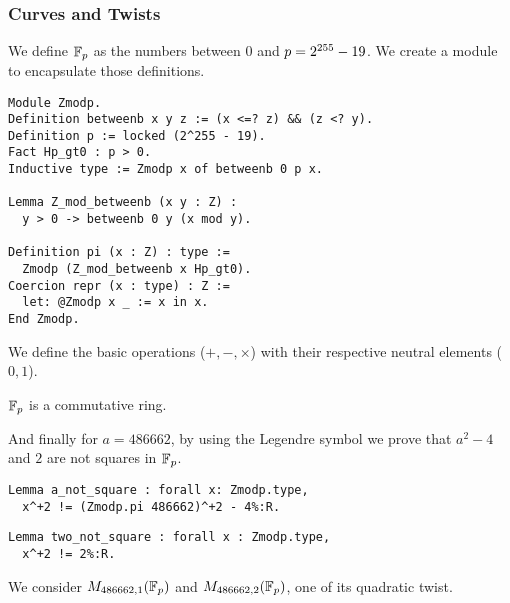 


\subsubsection{Curves and Twists}

We define $\mathbb{F}_{p}$ as the numbers between $0$ and $p = 2^{255}-19$.
We create a  module to encapsulate those definitions.
\begin{lstlisting}[language=Coq]
Module Zmodp.
Definition betweenb x y z := (x <=? z) && (z <? y).
Definition p := locked (2^255 - 19).
Fact Hp_gt0 : p > 0.
Inductive type := Zmodp x of betweenb 0 p x.

Lemma Z_mod_betweenb (x y : Z) :
  y > 0 -> betweenb 0 y (x mod y).

Definition pi (x : Z) : type :=
  Zmodp (Z_mod_betweenb x Hp_gt0).
Coercion repr (x : type) : Z :=
  let: @Zmodp x _ := x in x.
End Zmodp.
\end{lstlisting}

We define the basic operations ($+, -, \times$) with their respective neutral elements ($0, 1$).
\begin{lemma}
$\mathbb{F}_{p}$ is a commutative ring.
\end{lemma}
%
And finally for $a = 486662$, by using the Legendre symbol we prove that $a^2 - 4$ and $2$ are not squares in $\mathbb{F}_{p}$.
\begin{lstlisting}[language=Coq]
Lemma a_not_square : forall x: Zmodp.type,
  x^+2 != (Zmodp.pi 486662)^+2 - 4%:R.
\end{lstlisting}
\begin{lstlisting}[language=Coq,label=two_not_square]
Lemma two_not_square : forall x : Zmodp.type,
  x^+2 != 2%:R.
\end{lstlisting}
We consider $M_{486662,1}(\mathbb{F}_{p})$ and $M_{486662,2}(\mathbb{F}_{p})$, one of its quadratic twist.


